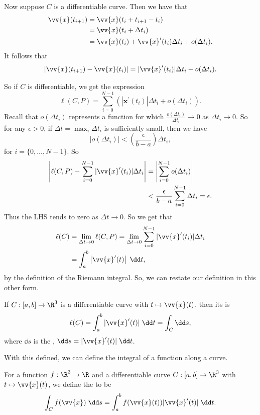 Now suppose $C$ is a differentiable curve. Then we have that
\begin{align*}
	\vv{x}(t_{i + 1}) &= \vv{x}(t_i + t_{i + 1} - t_i) \\
					&= \vv{x}(t_i + \Delta t_i) \\
					&= \vv{x}(t_i) + \vv{x}'(t_i) \Delta t_i + o(\Delta t_i).
\end{align*}
It follows that
$$
|\vv{x}(t_{i + 1}) - \vv{x}(t_i) | = |\vv{x}'(t_i)| \Delta t_i + o(\Delta t_i). 
$$

So if $C$ is differentiable, we get the expression
$$
\ell(C, P)=\sum_{i=0}^{N-1}\left(\left|\mathbf{x}^{\prime}\left(t_{i}\right)\right| \Delta t_{i}+o\left(\Delta t_{i}\right)\right).
$$
Recall that $o(\Delta t_i)$ represents a function for which $\frac{o(\Delta t_i)}{\Delta t_i} \rightarrow 0$ as $\Delta t_i \rightarrow 0$. So for any $\epsilon > 0$, if $\Delta t = \max_i \Delta t_i$  is sufficiently small, then we have
$$
|o(\Delta t_i) | < \left(\frac{\epsilon}{b - a}\right) \Delta t_i,
$$
for $i = \{0, \dots, N - 1\}$. So
\begin{align*}
	\left|\ell(C, P) - \sum_{i = 0}^{N - 1} |\vv{x}' (t_i)| \Delta t_i \right| &= \left|\sum_{i = 0}^{N - 1} o(\Delta t_i)\right| \\
	&< \frac{\epsilon}{b - a} \sum_{i = 0}^{N - 1} \Delta{t_i} = \epsilon.
\end{align*}
Thus the LHS tends to zero as $\Delta t \rightarrow 0$. So we get that
\begin{align*}
	\ell(C) &= \lim_{\Delta t \to 0} \ell(C, P) = \lim_{\Delta t \to 0} \sum_{i = 0}^{N - 1} |\vv{x}'(t_i)| \Delta t_i \\
		&= \int_a^b \left|\vv{x}'(t)\right| \; \dd t,
\end{align*}
by the definition of the Riemann integral.
So, we can restate our definition in this other form.

\begin{definition}
	If $C: [a, b] \rightarrow \R^3$ is a differentiable curve with $t \mapsto \vv{x}(t)$, then its  is
	$$
	\ell(C) = \int_a^b |\vv{x}'(t)| \; \dd t = \int_C \dd s,
	$$
where $\dd s$ is the , $\dd s = |\vv{x}'(t)| \; \dd t$.
\end{definition}

With this defined, we can define the integral of a function along a curve.

\begin{definition}
	For a function $f : \R^3 \rightarrow \R$ and a differentiable curve $C: [a, b] \rightarrow \R^3$ with $t \mapsto \vv{x}(t)$, we define the  to be
	$$
	\int_C f(\vv{x})\; \dd s = \int_a^b f(\vv{x}(t)) |\vv{x}'(t)| \; \dd t.
	$$
\end{definition}

